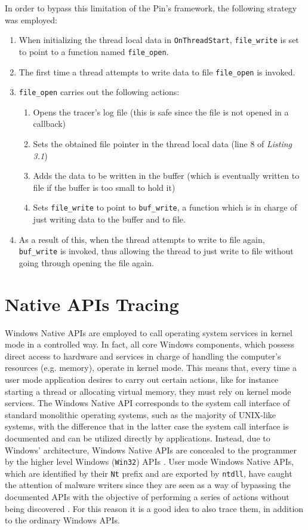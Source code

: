 In order to bypass this limitation of the Pin's framework, the following strategy was employed:
\begin{enumerate}
\item When initializing the thread local data in \texttt{OnThreadStart}, \texttt{file\_write} is set to point to a function named \texttt{file\_open}.
\item The first time a thread attempts to write data to file \texttt{file\_open} is invoked.
\item \texttt{file\_open} carries out the following actions:
\begin{enumerate}
\item Opens the tracer's log file (this is safe since the file is not opened in a callback)
\item Sets the obtained file pointer in the thread local data (line 8 of \textit{Listing 3.1})
\item Adds the data to be written in the buffer (which is eventually written to file if the buffer is too small to hold it)
\item Sets \texttt{file\_write} to point to \texttt{buf\_write}, a function which is in charge of just writing data to the buffer and to file.
\end{enumerate}
\item As a result of this, when the thread attempts to write to file again, \texttt{buf\_write} is invoked, thus allowing the thread to just write to file without going through opening the file again.   
\end{enumerate}   

\section{Native APIs Tracing}

Windows Native APIs are employed to call operating system services in kernel mode in a controlled way.  
In fact, all core Windows components, which possess direct access to hardware and services in charge of handling the computer's resources (e.g. memory), operate in kernel mode. This means that, every time a user mode application desires to carry out certain actions, like for instance starting a thread or allocating virtual memory, they must rely on kernel mode  services. The Windows Native API corresponds to the system call interface of standard monolithic operating systems, such as the majority of UNIX-like systems, with the difference that in the latter case the system call interface is documented and can be utilized directly by applications. Instead, due to Windows' architecture, Windows Native APIs are concealed to the programmer by the higher level Windows (\texttt{Win32}) APIs \cite{NTAPI1}. User mode Windows Native APIs, which are identified by their \texttt{Nt} prefix and are exported by \texttt{ntdll}, have caught the attention of malware writers since they are seen as a way of bypassing the documented APIs with the objective of performing a series of actions without being discovered \cite{NTAPI2}. For this reason it is a good idea to also trace them, in addition to the ordinary Windows APIs.  

